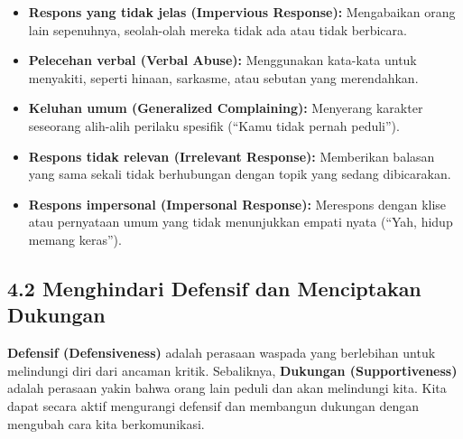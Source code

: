 \documentclass[
  letterpaper,
  DIV=11,
  numbers=noendperiod]{scrreprt}
\providecommand{\tightlist}{%
  \setlength{\itemsep}{0pt}\setlength{\parskip}{0pt}}
\begin{document}
\begin{itemize}
\tightlist
\item
  \textbf{Respons yang tidak jelas (Impervious Response):} Mengabaikan
  orang lain sepenuhnya, seolah-olah mereka tidak ada atau tidak
  berbicara.
\item
  \textbf{Pelecehan verbal (Verbal Abuse):} Menggunakan kata-kata untuk
  menyakiti, seperti hinaan, sarkasme, atau sebutan yang merendahkan.
\item
  \textbf{Keluhan umum (Generalized Complaining):} Menyerang karakter
  seseorang alih-alih perilaku spesifik (``Kamu tidak pernah peduli'').
\item
  \textbf{Respons tidak relevan (Irrelevant Response):} Memberikan
  balasan yang sama sekali tidak berhubungan dengan topik yang sedang
  dibicarakan.
\item
  \textbf{Respons impersonal (Impersonal Response):} Merespons dengan
  klise atau pernyataan umum yang tidak menunjukkan empati nyata (``Yah,
  hidup memang keras'').
\end{itemize}

\subsection{\texorpdfstring{\textbf{4.2 Menghindari Defensif dan
Menciptakan
Dukungan}}{4.2 Menghindari Defensif dan Menciptakan Dukungan}}\label{menghindari-defensif-dan-menciptakan-dukungan}

\textbf{Defensif (Defensiveness)} adalah perasaan waspada yang
berlebihan untuk melindungi diri dari ancaman kritik. Sebaliknya,
\textbf{Dukungan (Supportiveness)} adalah perasaan yakin bahwa orang
lain peduli dan akan melindungi kita. Kita dapat secara aktif mengurangi
defensif dan membangun dukungan dengan mengubah cara kita berkomunikasi.
\end{document}
